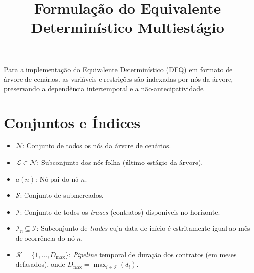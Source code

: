 \documentclass[12pt, a4paper]{article}
\title{Formulação do Equivalente Determinístico Multiestágio}
\date{}
\begin{document}
\maketitle

Para a implementação do Equivalente Determinístico (DEQ) em formato de árvore de cenários, as variáveis e restrições são indexadas por nós da árvore, preservando a dependência intertemporal e a não-antecipatividade.

\section{Conjuntos e Índices}
\begin{itemize}
    \item $\mathcal{N}$: Conjunto de todos os nós da árvore de cenários.
    \item $\mathcal{L} \subset \mathcal{N}$: Subconjunto dos nós folha (último estágio da árvore).
    \item $a(n)$: Nó pai do nó $n$.
    \item $\mathcal{S}$: Conjunto de submercados.
    \item $\mathcal{I}$: Conjunto de todos os \textit{trades} (contratos) disponíveis no horizonte.
    \item $\mathcal{I}_n \subseteq \mathcal{I}$: Subconjunto de \textit{trades} cuja data de início é estritamente igual ao mês de ocorrência do nó $n$.
    \item $\mathcal{K} = \{1, \dots, D_{\max}\}$: \textit{Pipeline} temporal de duração dos contratos (em meses defasados), onde $D_{\max} = \max_{i \in \mathcal{I}} (d_i)$.
\end{itemize}
\end{document}
